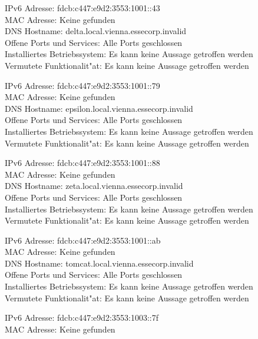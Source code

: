 \documentclass[12pt,a4paper,titlepage,oneside]{scrartcl}
\begin{document}
\begin{description}
\item
IPv6 Adresse: fdcb:c447:e9d2:3553:1001::43\\
MAC Adresse: Keine gefunden\\
DNS Hostname: delta.local.vienna.essecorp.invalid\\
Offene Ports und Services: Alle Ports geschlossen\\
Installiertes Betriebssystem: Es kann keine Aussage getroffen werden\\
Vermutete Funktionalit"at: Es kann keine Aussage getroffen werden\\
\item
IPv6 Adresse: fdcb:c447:e9d2:3553:1001::79\\
MAC Adresse: Keine gefunden\\
DNS Hostname: epsilon.local.vienna.essecorp.invalid\\
Offene Ports und Services: Alle Ports geschlossen\\
Installiertes Betriebssystem: Es kann keine Aussage getroffen werden\\
Vermutete Funktionalit"at: Es kann keine Aussage getroffen werden\\
\item
IPv6 Adresse: fdcb:c447:e9d2:3553:1001::88\\
MAC Adresse: Keine gefunden\\
DNS Hostname: zeta.local.vienna.essecorp.invalid\\
Offene Ports und Services: Alle Ports geschlossen\\
Installiertes Betriebssystem: Es kann keine Aussage getroffen werden\\
Vermutete Funktionalit"at: Es kann keine Aussage getroffen werden\\
\item
IPv6 Adresse: fdcb:c447:e9d2:3553:1001::ab\\
MAC Adresse: Keine gefunden\\
DNS Hostname: tomcat.local.vienna.essecorp.invalid\\
Offene Ports und Services: Alle Ports geschlossen\\
Installiertes Betriebssystem: Es kann keine Aussage getroffen werden\\
Vermutete Funktionalit"at: Es kann keine Aussage getroffen werden\\
\item
IPv6 Adresse: fdcb:c447:e9d2:3553:1003::7f\\
MAC Adresse: Keine gefunden\\

\end{description}
\end{document}
